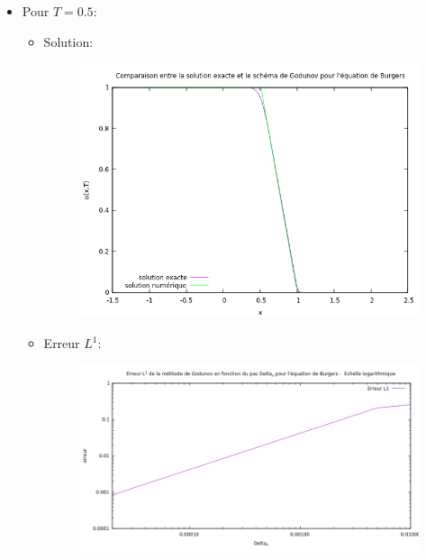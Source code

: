 \begin{itemize}

\item Pour $T = 0.5$: 

\begin{itemize}

\item Solution: 

\begin{figure}[h!]
	\centering \includegraphics[scale=0.7]{Images_Fichiers/burgers1.png}
\end{figure}
\newpage

\item Erreur $L^1$: 

\begin{figure}[h!]
	\centering \includegraphics[scale=0.7]{Images_Fichiers/berreur1.png}
\end{figure}


\end{itemize}
\end{itemize}
